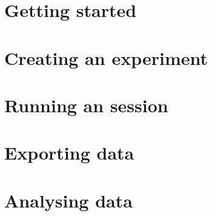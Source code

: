 \section{Getting started}



\section{Creating an experiment}

\section{Running an session}

\section{Exporting data}

\section{Analysing data}

